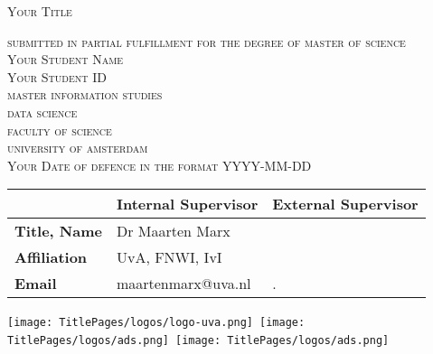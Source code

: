 \begin{titlepage}


\begin{center}
 
\textsc{\Large   Your Title }

\bigskip

\textsc{\large
submitted in partial fulfillment for the degree of master of science\\
%
\bigskip
Your Student Name\\
%
Your Student ID\\
%
\bigskip
master information studies\\
%
data science \\
%
faculty of science\\
%
university of amsterdam\\
%
\bigskip
Your Date of defence in the format YYYY-MM-DD
}

\end{center}
 

\vfill

\begin{center}
\begin{tabular}{|l||ll|}
\hline
 & \textbf{Internal  Supervisor} & \textbf{External   Supervisor}  \\   
 \hline
\textbf{Title, Name} & Dr Maarten Marx&  \\
\textbf{Affiliation} &UvA, FNWI, IvI & \\ 
\textbf{Email} & maartenmarx@uva.nl& . \\
\hline
\end{tabular}
\end{center}




\bigskip

\begin{center}
\mbox{\texttt{[image: TitlePages/logos/logo-uva.png]} 
\texttt{[image: TitlePages/logos/ads.png]}
\texttt{[image: TitlePages/logos/ads.png]} %
}
\end{center}
\end{titlepage}

%
%
%
